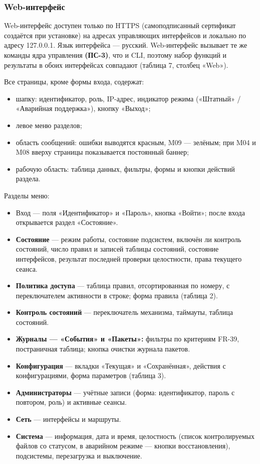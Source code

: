 \documentclass[13pt,a4paper,final]{article}
\begin{document}
	\subsubsection{Web-интерфейс}
	Web-интерфейс доступен только по HTTPS (самоподписанный сертификат создаётся при установке) на адресах управляющих интерфейсов и локально по адресу 127.0.0.1. Язык интерфейса — русский. Web-интерфейс вызывает те же команды ядра управления \textbf{(ПС-3)}, что и CLI, поэтому набор функций и результаты в обоих интерфейсах совпадают (таблица 7, столбец «Web»).
	
	Все страницы, кроме формы входа, содержат:
	\begin{itemize}
		\item шапку: идентификатор, роль, IP-адрес, индикатор режима («Штатный» / «Аварийная поддержка»), кнопку «Выход»;
		\item левое меню разделов;
		\item область сообщений: ошибки выводятся красным, M09 — зелёным; при M04 и M08 вверху страницы показывается постоянный баннер;
		\item рабочую область: таблица данных, фильтры, формы и кнопки действий раздела.
	\end{itemize}
	
	Разделы меню:
	\begin{itemize}
		\item Вход — поля «Идентификатор» и «Пароль», кнопка «Войти»; после входа открывается раздел «Состояние».
		\item \textbf{Состояние} — режим работы, состояние подсистем, включён ли контроль состояний, число правил и записей таблицы состояний, состояние интерфейсов, результат последней проверки целостности, права текущего сеанса.
		\item \textbf{Политика доступа} — таблица правил, отсортированная по номеру, с переключателем активности в строке; форма правила (таблица 2).
		\item \textbf{Контроль состояний} — переключатель механизма, таймауты, таблица состояний.
		\item \textbf{Журналы — «События» и «Пакеты»:} фильтры по критериям FR-39, постраничная таблица; кнопка очистки журнала пакетов.
		\item \textbf{Конфигурация} — вкладки «Текущая» и «Сохранённая», действия с конфигурациями, форма параметров (таблица 3).
		\item \textbf{Администраторы} — учётные записи (форма: идентификатор, пароль с повтором, роль) и активные сеансы.
		\item \textbf{Сеть} — интерфейсы и маршруты.
		\item \textbf{Система} — информация, дата и время, целостность (список контролируемых файлов со статусом, в аварийном режиме — кнопки восстановления), подсистемы, перезагрузка и выключение.
	\end{itemize}
	
\end{document}
